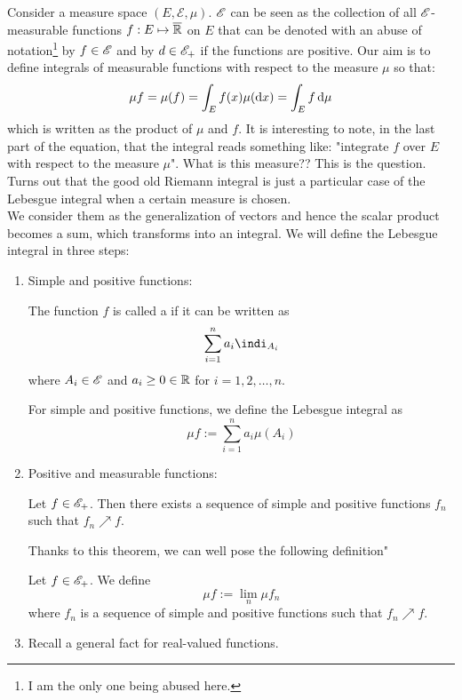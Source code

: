 \documentclass{report}
\begin{document}
	\begin{revise}
		Consider a measure space $(E,\mathscr{E},\mu)$. $\mathscr{E}$ can be seen as the collection of all $\mathscr{E}$-measurable functions $f:E\mapsto\overline{\mathbb{R}}$ on $E$ that can be denoted with an abuse of notation\footnote{I am the only one being abused here.} by $f\in\mathscr{E}$ and by $d\in\mathscr{E}_+$ if the functions are positive. Our aim is to define integrals of measurable functions with respect to the measure $\mu$ so that:
		\[\mu f=\mu(f)=\int_E f(x)\mu(\mathop{}\!\mathrm{d} x)=\int_Ef\mathop{}\!\mathrm{d}\mu\]
		which is written as the product of $\mu$ and $f$. It is interesting to note, in the last part of the equation, that the integral reads something like: "integrate $f$ over $E$ with respect to the measure $\mu$". What is this measure?? This is the question. Turns out that the good old Riemann integral is just a particular case of the Lebesgue integral when a certain measure is chosen.\\
		 We consider them as the generalization of vectors and hence the scalar product becomes a sum, which transforms into an integral. We will define the Lebesgue integral in three steps:
		\begin{enumerate}
			\item Simple and positive functions:
			\begin{definition}
			The function $f$ is called a  if it can be written as $$\sum_{i=1}^{n}a_i\indi_{A_i}$$ where $A_i\in\mathscr{E}$ and $a_i\geq0\in\mathbb{R}$ for $i=1,2,\ldots,n$.
			\end{definition}
			\begin{definition}
				For simple and positive functions, we define the Lebesgue integral as 
				\[\mu f:=\sum_{i=1}^{n}a_i\mu(A_i)\]
			\end{definition}
			\item Positive and measurable functions:
			\begin{theorem}
				Let $f\in\mathscr{E}_+$. Then there exists a sequence of simple and positive functions $f_n$ such that $f_n\nearrow f$.
			\end{theorem}
			Thanks to this theorem, we can well pose the following definition"
			\begin{definition}
				Let $f\in\mathscr{E}_+$. We define
				\[\mu f:=\lim_{n}\mu f_n\]
				where $f_n$ is a sequence of simple and positive functions such that  $f_n\nearrow f$.
			\end{definition}
			\item Recall a general fact for real-valued functions.
			\begin{remark}

\end{remark}
\end{enumerate}
\end{revise}
\end{document}
